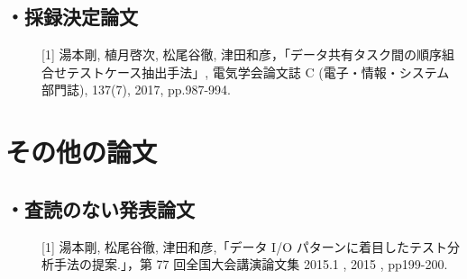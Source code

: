 \documentclass[a4paper,12pt]{jreport}
\begin{document}
\subsection*{・採録決定論文}
\begin{description}
  \item[] [1] 湯本剛, 植月啓次, 松尾谷徹, 津田和彦，「データ共有タスク間の順序組合せテストケース抽出手法」, 電気学会論文誌 C (電子・情報・システム部門誌), 137(7), 2017, pp.987-994.
\end{description}

\section*{その他の論文}
\subsection*{・査読のない発表論文}
\begin{description}
  \item[] [1] 湯本剛, 松尾谷徹, 津田和彦,「データ I/O パターンに着目したテスト分析手法の提案.」，第 77 回全国大会講演論文集 2015.1 , 2015 , pp199-200.
\end{description}
\end{document}

